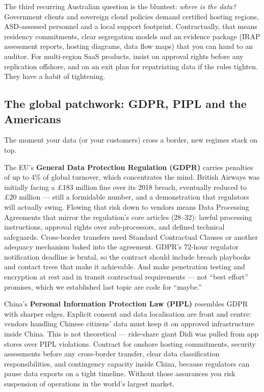 The third recurring Australian question is the bluntest: \emph{where is the data?} Government clients and sovereign cloud policies demand certified hosting regions, ASD-assessed personnel and a local support footprint. Contractually, that means residency commitments, clear segregation models and an evidence package (IRAP assessment reports, hosting diagrams, data flow maps) that you can hand to an auditor. For multi-region SaaS products, insist on approval rights before any replication offshore, and on an exit plan for repatriating data if the rules tighten. They have a habit of tightening.



\subsection{The global patchwork: GDPR, PIPL and the Americans}


The moment your data (or your customers) cross a border, new regimes stack on top.


The EU's \textbf{General Data Protection Regulation (GDPR)} carries penalties of up to 4\% of global turnover, which concentrates the mind. British Airways was initially facing a £183 million fine over its 2018 breach, eventually reduced to £20 million — still a formidable number, and a demonstration that regulators will actually swing. Flowing that risk down to vendors means Data Processing Agreements that mirror the regulation's core articles (28–32): lawful processing instructions, approval rights over sub-processors, and defined technical safeguards. Cross-border transfers need Standard Contractual Clauses or another adequacy mechanism baked into the agreement. GDPR's 72-hour regulator notification deadline is brutal, so the contract should include breach playbooks and contact trees that make it achievable. And make penetration testing and encryption at rest and in transit contractual requirements — not ``best effort'' promises, which we established last topic are code for ``maybe.''


China's \textbf{Personal Information Protection Law (PIPL)} resembles GDPR with sharper edges. Explicit consent and data localisation are front and centre: vendors handling Chinese citizens' data must keep it on approved infrastructure inside China. This is not theoretical — ride-share giant Didi was pulled from app stores over PIPL violations. Contract for onshore hosting commitments, security assessments before any cross-border transfer, clear data classification responsibilities, and contingency capacity inside China, because regulators can pause data exports on a tight timeline. Without those assurances you risk suspension of operations in the world's largest market.


